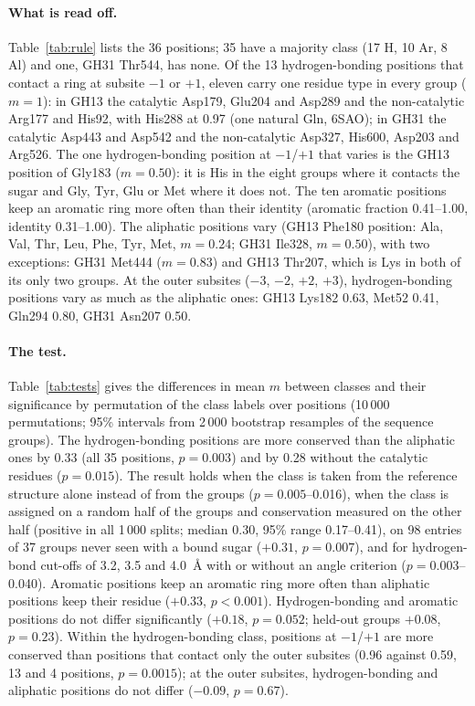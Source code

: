 \paragraph{What is read off.} Table~\ref{tab:rule} lists the 36 positions; 35 have a majority class
(17 H, 10 Ar, 8 Al) and one, GH31 Thr544, has none. Of the 13 hydrogen-bonding positions that contact a ring at subsite $-1$
or $+1$, eleven carry one residue type in every group ($m = 1$): in GH13 the catalytic Asp179,
Glu204 and Asp289 and the non-catalytic Arg177 and His92, with His288 at 0.97 (one natural Gln,
6SAO); in GH31 the catalytic Asp443 and Asp542 and the non-catalytic Asp327, His600, Asp203 and
Arg526. The one hydrogen-bonding position at $-1$/$+1$ that varies is the GH13 position of
Gly183 ($m = 0.50$): it is His in the eight groups where it contacts the sugar and Gly, Tyr, Glu
or Met where it does not. The ten aromatic positions keep an aromatic ring more often than
their identity (aromatic fraction 0.41--1.00, identity 0.31--1.00). The aliphatic positions vary
(GH13 Phe180 position: Ala, Val, Thr, Leu, Phe, Tyr, Met, $m = 0.24$; GH31 Ile328, $m = 0.50$),
with two exceptions: GH31 Met444 ($m = 0.83$) and GH13 Thr207, which is Lys in both of
its only two groups. At the outer subsites ($-3$, $-2$, $+2$, $+3$),
hydrogen-bonding positions vary as much as the aliphatic ones: GH13 Lys182 0.63, Met52 0.41,
Gln294 0.80, GH31 Asn207 0.50.

\paragraph{The test.} Table~\ref{tab:tests} gives the differences in mean $m$ between classes
and their significance by permutation of the class labels over positions (10\,000
permutations; 95\% intervals from 2\,000 bootstrap resamples of the sequence groups). The
hydrogen-bonding positions are more conserved than the aliphatic ones by 0.33 (all 35
positions, $p = 0.003$) and by 0.28 without the catalytic residues ($p = 0.015$). The result
holds when the class is taken from the reference structure alone instead of from the groups
($p = 0.005$--0.016), when the class is assigned on a random half of the groups and conservation
measured on the other half (positive in all 1\,000 splits; median 0.30, 95\% range
0.17--0.41), on 98 entries of 37 groups never seen with a bound sugar ($+0.31$, $p = 0.007$),
and for hydrogen-bond cut-offs of 3.2, 3.5 and 4.0~\AA{} with or without an angle criterion
($p = 0.003$--0.040). Aromatic positions keep an aromatic ring more often than aliphatic
positions keep their residue ($+0.33$, $p < 0.001$). Hydrogen-bonding and aromatic positions do
not differ significantly ($+0.18$, $p = 0.052$; held-out groups $+0.08$, $p = 0.23$). Within the
hydrogen-bonding class, positions at $-1$/$+1$ are more conserved than positions that contact
only the outer subsites (0.96 against 0.59, 13 and 4 positions, $p = 0.0015$); at the outer
subsites, hydrogen-bonding and aliphatic positions do not differ ($-0.09$, $p = 0.67$).


